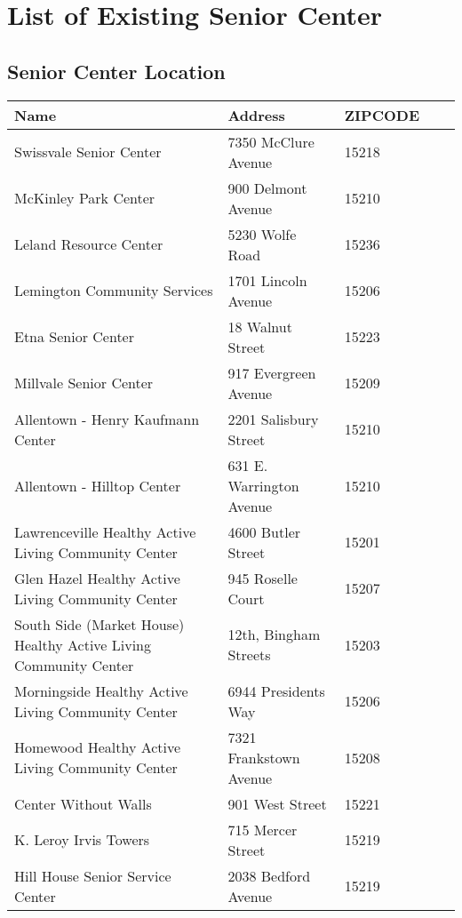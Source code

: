 \chapter{List of Existing Senior Center} %

\label{AppendixA} %

\section{Senior Center Location}
\begin{longtable}{ p{2.5in}| l | l  p{3in}  l}
\toprule
Name&Address&ZIPCODE\\
\midrule
Swissvale Senior Center&7350 McClure Avenue&15218\\
McKinley Park Center&900 Delmont Avenue&15210\\
Leland Resource Center&5230 Wolfe Road&15236\\
Lemington Community Services&1701 Lincoln Avenue&15206\\
Etna Senior Center&18 Walnut Street&15223\\
Millvale Senior Center&917 Evergreen Avenue&15209\\
Allentown - Henry Kaufmann Center&2201 Salisbury Street&15210\\
Allentown - Hilltop Center&631 E. Warrington Avenue&15210\\
Lawrenceville Healthy Active Living Community Center&4600 Butler Street&15201\\
Glen Hazel Healthy Active Living Community Center&945 Roselle Court&15207\\
South Side (Market House) Healthy Active Living Community Center&12th, Bingham Streets&15203\\
Morningside Healthy Active Living Community Center&6944 Presidents Way&15206\\
Homewood Healthy Active Living Community Center&7321 Frankstown Avenue&15208\\
Center Without Walls&901 West Street&15221\\
K. Leroy Irvis Towers&715 Mercer Street&15219\\
Hill House Senior Service Center&2038 Bedford Avenue&15219\\

\end{longtable}
